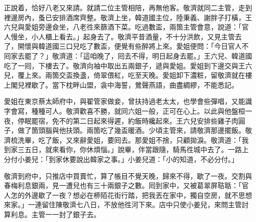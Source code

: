 正說着，恰好八老又來請。就請二位主管相陪，再無他客。敬濟就同二主管，走到裡邊房內，蚤已安排酒席齊整。敬濟上坐，韓道國主位，陸秉義、謝胖子打橫，王六兒與愛姐旁邊僉坐，八老徃來篩酒下菜。吃過數盃，兩箇主管會意，說道：「官人慢坐，小人櫃上看去。」起身去了。敬濟平昔酒量，不十分洪飲，又見主管去了，開懷與韓道國三口兒吃了數盃，便覺有些醉將上來。愛姐便問：「今日官人不囘家去罷了？」敬濟道：「這咱晚了，囘去不得，明日起身去罷。」王六兒、韓道國吃了一囘，下樓去了。敬濟向袖中取出五兩銀子，遞與愛姐。愛姐到下邊交與王六兒，覆上來。兩箇交盃換盞，倚翠偎紅，吃至天晚。愛姐卸下濃粧，留敬濟就在樓上閣兒裡歇了。當下枕畔山盟，衾中海誓，鶯聲燕語，曲盡綢繆，不能悉記。

愛姐在東京蔡太師府中，與翟管家做妾，曾扶持過老太太，也學會些彈唱，又能識字會寫，種種可人。敬濟歡喜不勝，就同六姐一般，正可在心上。{}以此與他盤桓一夜，停眠罷宿，免不的第二日起來得遲，約飯時纔起來。王六兒安排些雞子肉圓子，做了箇頭腦與他扶頭。兩箇吃了幾盃暖酒。少頃主管來，請敬濟那邊擺飯。敬濟梳洗畢，吃了飯，又來辭愛姐，要囘去。那愛姐不捨，只顧拋淚。{}敬濟道：「我到家三五日，就來看你，你休煩惱。」說畢，伴當跟隨，騎馬徃城中去了。一路上分付小姜兒：「到家休要說出韓家之事。」小姜兒道：「小的知道，不必分付。」

敬濟到府中，只推店中買賣忙，算了帳目不覺天晚，歸來不得，歇了一夜。交割與春梅利息銀兩，見一遭兒也有三十兩銀子之數。囘到家中，又被葛翠屏聐聒：「官人怎的外邊歇了一夜？想必在桺陌花街行踏，把我丟在家中，獨自空房，就不思想來家。」一連留住陳敬濟七八日，不放他徃河下來。店中只使小姜兒，來問主管討算利息。主管一一封了銀子去。

